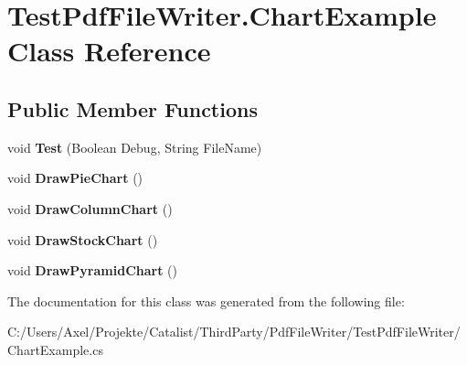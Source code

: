 \hypertarget{class_test_pdf_file_writer_1_1_chart_example}{}\section{Test\+Pdf\+File\+Writer.\+Chart\+Example Class Reference}
\label{class_test_pdf_file_writer_1_1_chart_example}
\subsection*{Public Member Functions}
\begin{DoxyCompactItemize}
\item 
void {\bfseries Test} (Boolean Debug, String File\+Name)\hypertarget{class_test_pdf_file_writer_1_1_chart_example_a1ee1f3ee949d2e869bbb7eea79691ffd}{}\label{class_test_pdf_file_writer_1_1_chart_example_a1ee1f3ee949d2e869bbb7eea79691ffd}

\item 
void {\bfseries Draw\+Pie\+Chart} ()\hypertarget{class_test_pdf_file_writer_1_1_chart_example_a6aa1ab7a47aa52341790cf3706a19012}{}\label{class_test_pdf_file_writer_1_1_chart_example_a6aa1ab7a47aa52341790cf3706a19012}

\item 
void {\bfseries Draw\+Column\+Chart} ()\hypertarget{class_test_pdf_file_writer_1_1_chart_example_a76425b1951260f4a2ba2d01b4ee60015}{}\label{class_test_pdf_file_writer_1_1_chart_example_a76425b1951260f4a2ba2d01b4ee60015}

\item 
void {\bfseries Draw\+Stock\+Chart} ()\hypertarget{class_test_pdf_file_writer_1_1_chart_example_a1152f2c03ddaf78d64449607067f9c1b}{}\label{class_test_pdf_file_writer_1_1_chart_example_a1152f2c03ddaf78d64449607067f9c1b}

\item 
void {\bfseries Draw\+Pyramid\+Chart} ()\hypertarget{class_test_pdf_file_writer_1_1_chart_example_af6a2c4769354d31aa155e17236440948}{}\label{class_test_pdf_file_writer_1_1_chart_example_af6a2c4769354d31aa155e17236440948}

\end{DoxyCompactItemize}


The documentation for this class was generated from the following file\+:\begin{DoxyCompactItemize}
\item 
C\+:/\+Users/\+Axel/\+Projekte/\+Catalist/\+Third\+Party/\+Pdf\+File\+Writer/\+Test\+Pdf\+File\+Writer/Chart\+Example.\+cs\end{DoxyCompactItemize}
